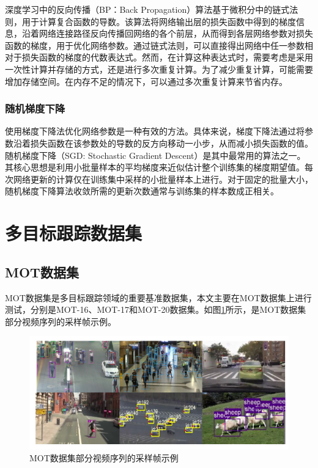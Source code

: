 深度学习中的反向传播（BP：Back Propagation）算法基于微积分中的链式法则，用于计算复合函数的导数。该算法将网络输出层的损失函数中得到的梯度信息，沿着网络连接路径反向传播回网络的各个前层，从而得到各层网络参数对损失函数的梯度，用于优化网络参数。通过链式法则，可以直接得出网络中任一参数相对于损失函数的梯度的代数表达式。然而，在计算这种表达式时，需要考虑是采用一次性计算并存储的方式，还是进行多次重复计算。为了减少重复计算，可能需要增加存储空间。在内存不足的情况下，可以通过多次重复计算来节省内存。




\subsubsection{随机梯度下降}


使用梯度下降法优化网络参数是一种有效的方法。具体来说，梯度下降法通过将参数沿着损失函数在该参数处的导数的反方向移动一小步，从而减小损失函数的值。随机梯度下降（SGD: Stochastic Gradient Descent）是其中最常用的算法之一。其核心思想是利用小批量样本的平均梯度来近似估计整个训练集的梯度期望值。每次网络更新的计算仅在训练集中采样的小批量样本上进行。对于固定的批量大小，随机梯度下降算法收敛所需的更新次数通常与训练集的样本数成正相关。



\section{多目标跟踪数据集}

\subsection{MOT数据集}

MOT数据集是多目标跟踪领域的重要基准数据集，本文主要在MOT数据集上进行测试，分别是MOT-16\cite{Mahmoudi.etal2019}、MOT-17\cite{Sun.etal2021}和MOT-20数据集\cite{Yan.etal2022}。如图\ref{fig:np101}所示，是MOT数据集部分视频序列的采样帧示例。

\begin{figure}[htbp] %
	\centering
	\includegraphics[width=1\textwidth]{np101} %
	\caption{MOT数据集部分视频序列的采样帧示例} %
	\label{fig:np101} %
\end{figure}


